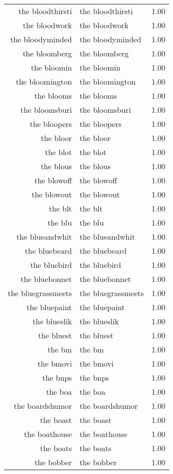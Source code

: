\begin{table}[ht]
\begin{tabular}{rlr}
  the bloodthirsti & the bloodthirsti & 1.00 \\ 
  the bloodwork & the bloodwork & 1.00 \\ 
  the bloodyminded & the bloodyminded & 1.00 \\ 
  the bloomberg & the bloomberg & 1.00 \\ 
  the bloomin & the bloomin & 1.00 \\ 
  the bloomington & the bloomington & 1.00 \\ 
  the blooms & the blooms & 1.00 \\ 
  the bloomsburi & the bloomsburi & 1.00 \\ 
  the bloopers & the bloopers & 1.00 \\ 
  the bloor & the bloor & 1.00 \\ 
  the blot & the blot & 1.00 \\ 
  the blous & the blous & 1.00 \\ 
  the blowoff & the blowoff & 1.00 \\ 
  the blowout & the blowout & 1.00 \\ 
  the blt & the blt & 1.00 \\ 
  the blu & the blu & 1.00 \\ 
  the blueandwhit & the blueandwhit & 1.00 \\ 
  the bluebeard & the bluebeard & 1.00 \\ 
  the bluebird & the bluebird & 1.00 \\ 
  the bluebonnet & the bluebonnet & 1.00 \\ 
  the bluegrassmeets & the bluegrassmeets & 1.00 \\ 
  the bluepaint & the bluepaint & 1.00 \\ 
  the blueslik & the blueslik & 1.00 \\ 
  the bluest & the bluest & 1.00 \\ 
  the bm & the bm & 1.00 \\ 
  the bmovi & the bmovi & 1.00 \\ 
  the bnps & the bnps & 1.00 \\ 
  the boa & the boa & 1.00 \\ 
  the boardshumor & the boardshumor & 1.00 \\ 
  the boast & the boast & 1.00 \\ 
  the boathouse & the boathouse & 1.00 \\ 
  the boats & the boats & 1.00 \\ 
  the bobber & the bobber & 1.00 \\ 

\end{tabular}
\end{table}

